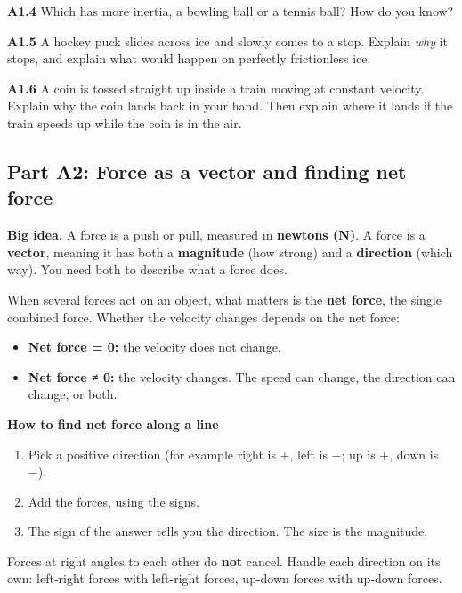 \documentclass[
]{article}
\providecommand{\tightlist}{%
  \setlength{\itemsep}{0pt}\setlength{\parskip}{0pt}}
\begin{document}
\textbf{A1.4} Which has more inertia, a bowling ball or a tennis ball?
How do you know?

\textbf{A1.5} A hockey puck slides across ice and slowly comes to a
stop. Explain \emph{why} it stops, and explain what would happen on
perfectly frictionless ice.

\textbf{A1.6} A coin is tossed straight up inside a train moving at
constant velocity. Explain why the coin lands back in your hand. Then
explain where it lands if the train speeds up while the coin is in the
air.

\subsection{Part A2: Force as a vector and finding net
force}\label{part-a2-force-as-a-vector-and-finding-net-force}

\textbf{Big idea.} A force is a push or pull, measured in
\textbf{newtons (N)}. A force is a \textbf{vector}, meaning it has both
a \textbf{magnitude} (how strong) and a \textbf{direction} (which way).
You need both to describe what a force does.

When several forces act on an object, what matters is the \textbf{net
force}, the single combined force. Whether the velocity changes depends
on the net force:

\begin{itemize}
\tightlist
\item
  \textbf{Net force = 0:} the velocity does not change.
\item
  \textbf{Net force ≠ 0:} the velocity changes. The speed can change,
  the direction can change, or both.
\end{itemize}

\textbf{How to find net force along a line}

\begin{enumerate}
\def\labelenumi{\arabic{enumi}.}
\tightlist
\item
  Pick a positive direction (for example right is +, left is −; up is +,
  down is −).
\item
  Add the forces, using the signs.
\item
  The sign of the answer tells you the direction. The size is the
  magnitude.
\end{enumerate}

Forces at right angles to each other do \textbf{not} cancel. Handle each
direction on its own: left-right forces with left-right forces, up-down
forces with up-down forces.
\end{document}
